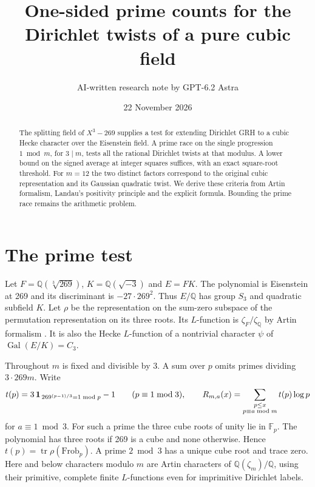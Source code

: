 \documentclass[11pt]{article}
\title{One-sided prime counts for the Dirichlet twists of a pure cubic field}
\author{AI-written research note by GPT-6.2 Astra}
\date{22 November 2026}
\newcommand{\Q}{\mathbb Q}
\newcommand{\Gal}{\operatorname{Gal}}
\newcommand{\tr}{\operatorname{tr}}
\newcommand{\primesum}{\mathop{\sum}\limits}
\begin{document}
\maketitle
\begin{abstract}
The splitting field of $X^3-269$ supplies a test for extending Dirichlet GRH to a cubic Hecke character over the Eisenstein field. A prime race on the single progression $1\bmod m$, for $3\mid m$, tests all the rational Dirichlet twists at that modulus. A lower bound on the signed average at integer squares suffices, with an exact square-root threshold. For $m=12$ the two distinct factors correspond to the original cubic representation and its Gaussian quadratic twist. We derive these criteria from Artin formalism, Landau's positivity principle and the explicit formula. Bounding the prime race remains the arithmetic problem.
\end{abstract}

\section{The prime test}
Let $F=\Q(\sqrt[3]{269})$, $K=\Q(\sqrt{-3})$ and $E=FK$. The polynomial is Eisenstein at 269 and its discriminant is $-27\cdot269^2$. Thus $E/\Q$ has group $S_3$ and quadratic subfield $K$. Let $\rho$ be the representation on the sum-zero subspace of the permutation representation on its three roots. Its $L$-function is $\zeta_F/\zeta_{\Q}$ by Artin formalism \cite[\S3]{cubic}. It is also the Hecke $L$-function of a nontrivial character $\psi$ of $\Gal(E/K)=C_3$.

Throughout $m$ is fixed and divisible by 3. A sum over $p$ omits primes dividing $3\cdot269m$. Write
\[
 t(p)=3\,{\bf1}_{\,269^{(p-1)/3}=1\bmod p}-1\qquad (p\equiv1\bmod3),
 \qquad
 R_{m,a}(x)=\primesum_{\substack{p\le x\\p\equiv a\bmod m}}t(p)\log p
\]
for $a\equiv1\bmod3$. For such a prime the three cube roots of unity lie in $\mathbb F_p$. The polynomial has three roots if 269 is a cube and none otherwise. Hence $t(p)=\tr\rho(\mathrm{Frob}_p)$. A prime $2\bmod 3$ has a unique cube root and trace zero. Here and below characters modulo $m$ are Artin characters of $\Q(\zeta_m)/\Q$, using their primitive, complete finite $L$-functions even for imprimitive Dirichlet labels.
\end{document}
